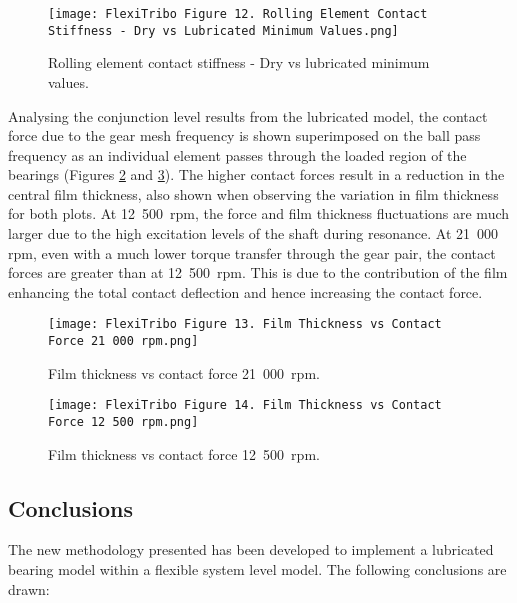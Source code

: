 \begin{figure}  
	\texttt{[image: FlexiTribo Figure 12. Rolling Element Contact Stiffness - Dry vs Lubricated Minimum Values.png]}
	\caption{Rolling element contact stiffness - Dry vs lubricated minimum values.}
	\label{Rolling element contact stiffness - Dry vs lubricated minimum values}
\end{figure}

Analysing the conjunction level results from the lubricated model, the contact force due to the gear mesh frequency is shown superimposed on the ball pass frequency as an individual element passes through the loaded region of the bearings (Figures \ref{Film thickness vs contact force 21 000 rpm} and \ref{Film thickness vs contact force 12 500 rpm}). The higher contact forces result in a reduction in the central film thickness, also shown when observing the variation in film thickness for both plots. At 12~500~$\mathrm{rpm}$, the force and film thickness fluctuations are much larger due to the high excitation levels of the shaft during resonance. At 21~000~$\mathrm{rpm}$, even with a much lower torque transfer through the gear pair, the contact forces are greater than at 12~500~$\mathrm{rpm}$. This is due to the contribution of the film enhancing the total contact deflection and hence increasing the contact force.

\begin{figure}  
	\texttt{[image: FlexiTribo Figure 13. Film Thickness vs Contact Force 21 000 rpm.png]}
	\caption{Film thickness vs contact force 21~000~$\mathrm{rpm}$.}
	\label{Film thickness vs contact force 21 000 rpm}
\end{figure}

\begin{figure}  
	\texttt{[image: FlexiTribo Figure 14. Film Thickness vs Contact Force 12 500 rpm.png]}
	\caption{Film thickness vs contact force 12~500~$\mathrm{rpm}$.}
	\label{Film thickness vs contact force 12 500 rpm}
\end{figure}

\subsection{Conclusions}

The new methodology presented has been developed to implement a lubricated bearing model within a flexible system level model. The following conclusions are drawn:

